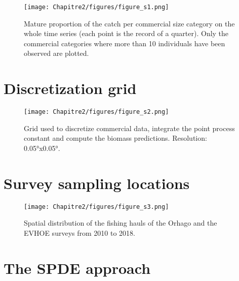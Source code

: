\begin{figure}[H]
   \begin{center}
      \texttt{[image: Chapitre2/figures/figure\_s1.png]}
   \end{center}
   \caption[Mature proportion of the catch per commercial size category on the whole time series (each point is the record of a quarter).]
   {Mature proportion of the catch per commercial size category on the whole time series (each point is the record of a quarter). Only the commercial categories where more than 10 individuals have been observed are plotted.}
   \label{fig:Chap2FigS1}
\end{figure}

\section{Discretization grid}\label{appendix:DiscrGrid}

\begin{figure}[H]
   \begin{center}
      \texttt{[image: Chapitre2/figures/figure\_s2.png]}
   \end{center}
   \caption[Grid used to discretize commercial data, integrate the point process constant and compute the biomass predictions.]
   {Grid used to discretize commercial data, integrate the point process constant and compute the biomass predictions. Resolution: 0.05°x0.05°.}
   \label{fig:Chap2FigS2}
\end{figure}

\section{Survey sampling locations}\label{appendix:SurveyInfoPap2}

\begin{figure}[H]
   \begin{center}
      \texttt{[image: Chapitre2/figures/figure\_s3.png]}
   \end{center}
   \caption[Spatial distribution of the fishing hauls of the Orhago and the EVHOE surveys from 2010 to 2018.]
   {Spatial distribution of the fishing hauls of the Orhago and the EVHOE surveys from 2010 to 2018.}
   \label{fig:Chap2FigS3}
\end{figure}

\newpage

\section{The SPDE approach}\label{appendix:SPDEappro}

